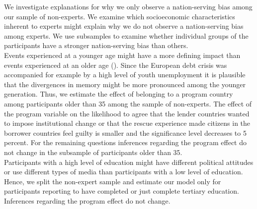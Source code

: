 We investigate explanations for why we only observe a nation-serving bias among our sample of non-experts. 
We examine which socioeconomic characteristics inherent to experts might explain why we do not observe a nation-serving bias among experts. We use subsamples to examine whether individual groups of the participants have a stronger nation-serving bias than others.
\\
 Events experienced at a younger age might have a more defining impact than events experienced at an older age (\cite{baumeister}). Since the European debt crisis was accompanied for example by a high level of youth unemployment it is plausible that the divergences in memory might be more pronounced among the younger generation. Thus, we estimate the effect of belonging to a program country among participants older than 35 among the sample of non-experts.  The effect of the program variable on the likelihood to agree that the lender countries wanted to impose institutional change or that the rescue experience made citizens in the borrower countries feel guilty is smaller and the significance level decreases to 5 percent. For the remaining questions inferences regarding the program effect do not change in the subsample of participants older than 35. 
\\
Participants with a high level of education might have different political attitudes or use different types of media than participants with a low level of education. Hence, we split the non-expert sample and estimate our model only for participants reporting to have completed or just complete tertiary education. Inferences regarding the program effect do not change. 
\\

